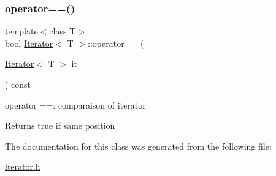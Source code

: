 \subsubsection{\texorpdfstring{operator==()}{operator==()}}
{\footnotesize\ttfamily template$<$class T$>$ \\
bool \hyperlink{class_iterator}{Iterator}$<$ T $>$\+::operator== (\begin{DoxyParamCaption}\item[{\hyperlink{class_iterator}{Iterator}$<$ T $>$}]{it }\end{DoxyParamCaption}) const\hspace{0.3cm}{\ttfamily [inline]}}



operator ==\+: comparaison of iterator 

\begin{DoxyReturn}{Returns}
true if same position 
\end{DoxyReturn}


The documentation for this class was generated from the following file\+:\begin{DoxyCompactItemize}
\item 
\hyperlink{iterator_8h}{iterator.\+h}\end{DoxyCompactItemize}
